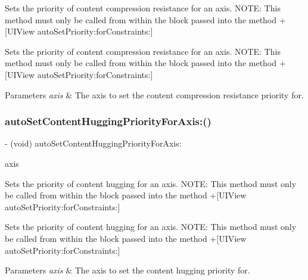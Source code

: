 Sets the priority of content compression resistance for an axis. N\+O\+TE\+: This method must only be called from within the block passed into the method +\mbox{[}U\+I\+View auto\+Set\+Priority\+:for\+Constraints\+:\mbox{]}

Sets the priority of content compression resistance for an axis. N\+O\+TE\+: This method must only be called from within the block passed into the method +\mbox{[}U\+I\+View auto\+Set\+Priority\+:for\+Constraints\+:\mbox{]}


\begin{DoxyParams}{Parameters}
{\em axis} & The axis to set the content compression resistance priority for. \\
\hline
\end{DoxyParams}
\mbox{\label{category_u_i_view_07_auto_layout_08_ac41c8271f622bd4b9e5fda8338679632}} 
\subsubsection{\texorpdfstring{auto\+Set\+Content\+Hugging\+Priority\+For\+Axis\+:()}{autoSetContentHuggingPriorityForAxis:()}}
{\footnotesize\ttfamily -\/ (void) auto\+Set\+Content\+Hugging\+Priority\+For\+Axis\+: \begin{DoxyParamCaption}\item[{(A\+L\+Axis)}]{axis }\end{DoxyParamCaption}}

Sets the priority of content hugging for an axis. N\+O\+TE\+: This method must only be called from within the block passed into the method +\mbox{[}U\+I\+View auto\+Set\+Priority\+:for\+Constraints\+:\mbox{]}

Sets the priority of content hugging for an axis. N\+O\+TE\+: This method must only be called from within the block passed into the method +\mbox{[}U\+I\+View auto\+Set\+Priority\+:for\+Constraints\+:\mbox{]}


\begin{DoxyParams}{Parameters}
{\em axis} & The axis to set the content hugging priority for. \\
\hline
\end{DoxyParams}
\mbox{\label{category_u_i_view_07_auto_layout_08_a75d72195d3afa144a1ee06dce72567be}} 
